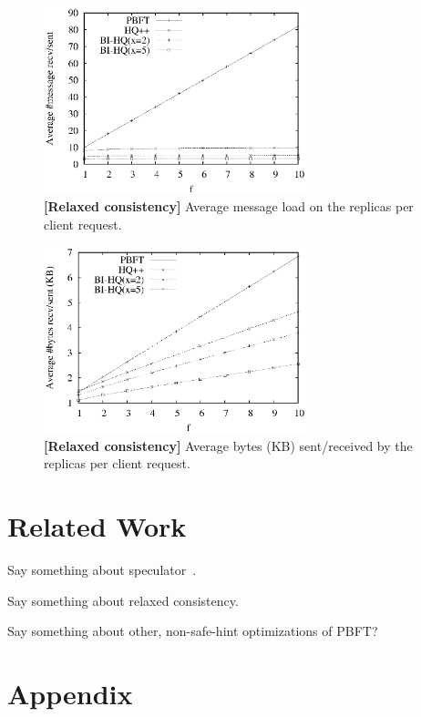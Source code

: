 \documentclass[twocolumn,10pt]{article}
\begin{document}
\begin{figure}
\centering
\includegraphics[width=3in]{graphs/Mesg_Count_Comp_BI_HQS}
\caption{\textbf{[Relaxed consistency]} Average message load on the replicas
per client request.
}
\label{fig:mesg_comp_bi}
\end{figure}

\begin{figure}
\centering
\includegraphics[width=3in]{graphs/Byte_Count_Comp_BI_New}
\caption{\textbf{[Relaxed consistency]} Average bytes (KB) sent/received by the replicas per client
request.
}
\label{fig:bytes_comp_bi_new}
\end{figure}

\fi


\section{Related Work}

Say something about speculator~\cite{Speculator-sosp-05}.

Say something about relaxed consistency.

Say something about other, non-safe-hint optimizations of PBFT?

\fi







\section{Appendix}
\end{document}
